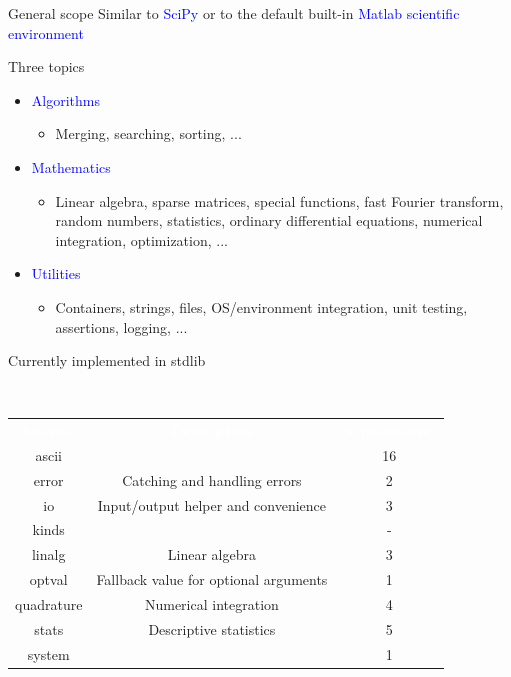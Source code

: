 \documentclass{beamer}
\begin{document}
\begin{frame}[t]{General scope}
	Similar to \textcolor{blue}{SciPy} or
	to the default built-in \textcolor{blue}{Matlab scientific environment}

        \textcolor{mygreen}{Three} topics
	\begin{itemize}
		\item \textcolor{blue}{Algorithms}
		\begin{itemize}
			\item Merging, searching, sorting, ...
		\end{itemize}
		\item \textcolor{blue}{Mathematics}
		\begin{itemize}
			\item Linear algebra, sparse matrices, special functions, fast Fourier transform, random numbers, statistics, ordinary differential equations, numerical integration, optimization, ...
		\end{itemize}
		\item \textcolor{blue}{Utilities}
		\begin{itemize}
			\item Containers, strings, files, OS/environment integration, unit testing, assertions, logging, ...
		\end{itemize}
	\end{itemize}
\end{frame}


\begin{frame}[c]{Currently implemented in stdlib}
	\begin{block}{~\vspace{0.5cm}}
	\vspace{-0.8cm}
	\begin{tabular}{ccc}
		\textcolor{white}{\bf Module} &\textcolor{white}{\bf Description} &\textcolor{white}{\bf \# procedures} \\
		ascii & & 16\\
		error & Catching and handling errors & 2\\
		io & Input/output helper and convenience & 3\\
		kinds & & -\\
		linalg & Linear algebra & 3\\
		optval & Fallback value for optional arguments & 1\\
		quadrature & Numerical integration & 4\\
		stats & Descriptive statistics & 5\\
		system & & 1 \\
	\end{tabular}
	\end{block}
\end{frame}
\end{document}
